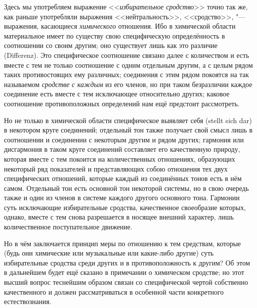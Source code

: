 
Здесь мы употребляем выражение <<{\em избирательное сродство}>> точно так же,
как раньше употребляли выражения <<нейтральность>>, <<сродство>>, "---
выражения, касающиеся {\em химического} отношения. Ибо в химической области
материальное имеет по существу свою специфическую определённость в соотношении
со своим другим; оно существует лишь как это различие (Diffe\-renz). Это
специфическое соотношение связано далее с количеством и есть вместе с тем не
только соотношение с одним отдельным другим, а с целым рядом таких
противостоящих ему различных; соединения с этим рядом покоятся на так
называемом {\em сродстве с каждым} из его членов, но при таком безразличии
каждое соединение есть вместе с тем исключающее относительно других; каковое
соотношение противоположных определений нам ещё предстоит рассмотреть.

Но не только в химической области специфическое выявляет себя (stellt sich dar)
в некотором круге соединений; отдельный тон также получает свой смысл лишь в
соотношении и соединении с некоторым другим и рядом других; гармония или
дисгармония в таком круге соединений составляет его качественную природу,
которая вместе с тем покоится на количественных отношениях, образующих
некоторый ряд показателей и представляющих собою отношения тех двух
специфических отношений, которые каждый из соединённых тонов есть в нём самом.
Отдельный тон есть основной тон некоторой системы, но в свою очередь также и
один из членов в системе каждого другого основного тона. Гармонии суть
исключающие избирательные сродства, качественное своеобразие которых, однако,
вместе с тем снова разрешается в носящее внешний характер, лишь количественное
поступательное движение.

Но в чём заключается принцип меры по отношению к тем средствам, которые (будь
они химические или музыкальные или какие-либо другие) суть избирательные
сродства среди других и в противоположность к другим? Об этом в дальнейшем
будет ещё сказано в примечании о химическом сродстве; но этот высший вопрос
теснейшим образом связан со специфической чертой собственно качественного и
должен рассматриваться в особенной части конкретного естествознания.

